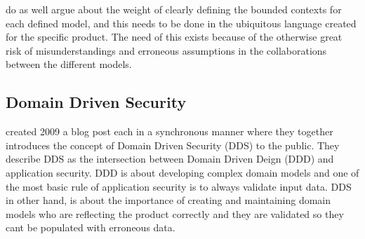 \textcite{evans_2015} do as well argue about the weight of clearly defining the bounded contexts for each defined model, and this needs to be done in the ubiquitous language created for the specific product. The need of this exists because of the otherwise great risk of misunderstandings and erroneous assumptions in the collaborations between the different models. \parencite{millett_2015}


\subsection{Domain Driven Security}
\textcite{Wilander2009, Johnsson2009} created 2009 a blog post each in a synchronous manner where they together introduces the concept of Domain Driven Security (DDS) to the public. They describe DDS as the intersection between Domain Driven Deign (DDD) and application security. DDD is about developing complex domain models and one of the most basic rule of application security is to always validate input data. DDS in other hand, is about the importance of creating and maintaining domain models who are reflecting the product correctly and they are validated so they cant be populated with erroneous data. \parencite{Wilander2009, Johnsson2009, Arnor2016, Stendahl2016} 